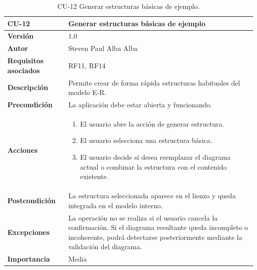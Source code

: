 \begin{table}[p]
\centering
\begin{tabularx}{\linewidth}{ p{} p{} }
\toprule
\textbf{CU-12} & \textbf{Generar estructuras básicas de ejemplo}\\
\toprule
\textbf{Versión} & 1.0 \\
\textbf{Autor} & Steven Paul Alba Alba \\
\textbf{Requisitos asociados} & RF11, RF14 \\
\textbf{Descripción} & Permite crear de forma rápida estructuras habituales del modelo E-R. \\
\textbf{Precondición} & La aplicación debe estar abierta y funcionando. \\
\textbf{Acciones} &
\begin{enumerate}
\def\labelenumi{\arabic{enumi}.}
\tightlist
\item El usuario abre la acción de generar estructura.
\item El usuario selecciona una estructura básica.
\item El usuario decide si desea reemplazar el diagrama actual o combinar la estructura con el contenido existente.
\end{enumerate}\\
\textbf{Postcondición} & La estructura seleccionada aparece en el lienzo y queda integrada en el modelo interno. \\
\textbf{Excepciones} & La operación no se realiza si el usuario cancela la confirmación. Si el diagrama resultante queda incompleto o incoherente, podrá detectarse posteriormente mediante la validación del diagrama. \\
\textbf{Importancia} & Media \\
\bottomrule
\end{tabularx}
\caption{CU-12 Generar estructuras básicas de ejemplo.}
\end{table}


